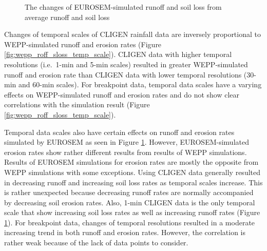 \begin{figure}[p]
  \centering
  \caption{The changes of EUROSEM-simulated runoff and soil loss from average
runoff and soil loss}
  \label{fig:eurosem_roff_sloss_temp_scale}
\end{figure}

Changes of temporal scales of CLIGEN rainfall data are inversely proportional
to WEPP-simulated runoff and erosion rates (Figure
\ref{fig:wepp_roff_sloss_temp_scale}). CLIGEN data with higher temporal
resolutions (i.e.\ 1-min and 5-min scales) resulted in greater WEPP-simulated
runoff and erosion rate than CLIGEN data with lower temporal resolutions (30-min
and 60-min scales). For breakpoint data, temporal data scales have a varying
effects on WEPP-simulated runoff and erosion rates and do not show clear
correlations with the simulation result (Figure
\ref{fig:wepp_roff_sloss_temp_scale}).

Temporal data scales also have certain effects on runoff and erosion rates
simulated by EUROSEM as seen in Figure \ref{fig:eurosem_roff_sloss_temp_scale}.
However, EUROSEM-simulated erosion rates show rather different results from
results of WEPP simulations. Results of EUROSEM simulations for erosion rates
are mostly the opposite from WEPP simulations with some exceptions. Using CLIGEN
data generally resulted in decreasing runoff and increasing soil loss rates as
temporal scales increase. This is rather unexpected because decreasing runoff
rates are normally accompanied by decreasing soil erosion rates. Also, 1-min
CLIGEN data is the only temporal scale that show increasing soil loss rates as
well as increasing runoff rates (Figure
\ref{fig:eurosem_roff_sloss_temp_scale}). For breakpoint data, changes of
temporal resolutions resulted in a moderate increasing trend in both runoff and
erosion rates. However, the correlation is rather weak because of the lack of
data points to consider.

